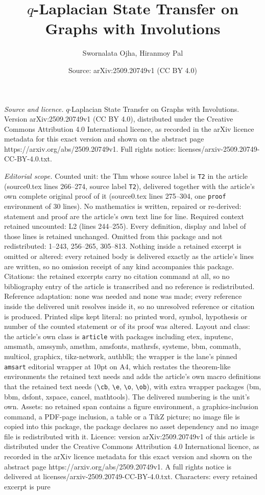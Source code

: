 \documentclass[10pt,a4paper]{amsart}
\title[$q$-Laplacian State Transfer on Graphs with Involutions]{$q$-Laplacian State Transfer on Graphs with Involutions}
\author{Swornalata Ojha, Hiranmoy Pal}
\date{Source: arXiv:2509.20749v1 (CC BY 4.0)}
\begin{document}
\maketitle

\noindent\emph{Source and licence.} $q$-Laplacian State Transfer on Graphs with Involutions. Version arXiv:2509.20749v1 (CC BY 4.0), distributed under the Creative Commons Attribution 4.0 International licence, as recorded in the arXiv licence metadata for this exact version and shown on the abstract page https://arxiv.org/abs/2509.20749v1. Full rights notice: licenses/arxiv-2509.20749-CC-BY-4.0.txt.\par\smallskip

\noindent\textit{Editorial scope.} Counted unit: the Thm whose source label is \texttt{T2} in the article (source0.tex lines 266--274, source label \texttt{T2}), delivered together with the article's own complete original proof of it (source0.tex lines 275--304, one \texttt{proof} environment of 30 lines). No mathematics is written, repaired or re-derived: statement and proof are the article's own text line for line. Required context retained uncounted: L2 (lines 244--255). Every definition, display and label of those lines is retained unchanged. Omitted from this package and not redistributed: 1--243, 256--265, 305--813. Nothing inside a retained excerpt is omitted or altered: every retained body is delivered exactly as the article's lines are written, so no omission receipt of any kind accompanies this package. Citations: the retained excerpts carry no citation command at all, so no bibliography entry of the article is transcribed and no reference is redistributed. Reference adaptation: none was needed and none was made; every reference inside the delivered unit resolves inside it, so no unresolved reference or citation is produced. Printed slips kept literal: no printed word, symbol, hypothesis or number of the counted statement or of its proof was altered. Layout and class: the article's own class is \texttt{article} with packages including etex, inputenc, amsmath, amssymb, amsthm, amsfonts, mathrsfs, systeme, bbm, commath, multicol, graphicx, tikz-network, authblk; the wrapper is the lane's pinned \texttt{amsart} editorial wrapper at 10pt on A4, which restates the theorem-like environments the retained text needs and adds the article's own macro definitions that the retained text needs (\texttt{\textbackslash cb}, \texttt{\textbackslash e}, \texttt{\textbackslash o}, \texttt{\textbackslash ob}), with extra wrapper packages (bm, bbm, dsfont, xspace, cancel, mathtools). The delivered numbering is the unit's own. Assets: no retained span contains a figure environment, a graphics-inclusion command, a PDF-page inclusion, a table or a TikZ picture; no image file is copied into this package, the package declares no asset dependency and no image file is redistributed with it. Licence: version arXiv:2509.20749v1 of this article is distributed under the Creative Commons Attribution 4.0 International licence, as recorded in the arXiv licence metadata for this exact version and shown on the abstract page https://arxiv.org/abs/2509.20749v1. A full rights notice is delivered at licenses/arxiv-2509.20749-CC-BY-4.0.txt. Characters: every retained excerpt is pure 
\end{document}
